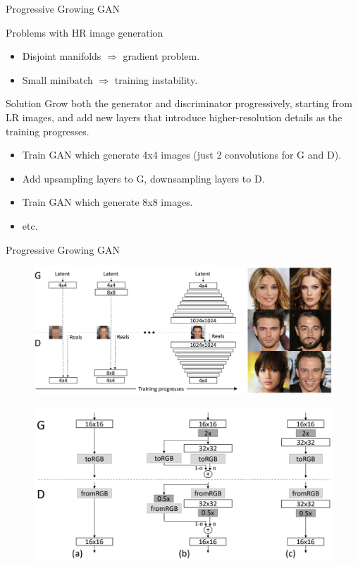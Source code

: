 \begin{frame}{Progressive Growing GAN}
	\begin{block}{Problems with HR image generation}
		\begin{itemize}
			\item Disjoint manifolds $\Rightarrow$ gradient problem.
			\item Small minibatch $\Rightarrow$ training instability.
		\end{itemize}
	\end{block}
	\begin{block}{Solution}
		Grow both the generator and discriminator progressively, starting from LR images, and add new layers that introduce higher-resolution details as the training progresses. 
		\begin{itemize}
			\item Train GAN which generate 4x4 images (just 2 convolutions for G and D).
			\item Add upsampling layers to G, downsampling layers to D.
			\item Train GAN which generate 8x8 images.
			\item etc.
		\end{itemize}
	\end{block}
	
\end{frame}
\begin{frame}{Progressive Growing GAN}
	\begin{figure}
		\centering
		\includegraphics[width=0.8\linewidth]{figs/pggan_arch}
	\end{figure}
	\begin{figure}
		\centering
		\includegraphics[width=0.6\linewidth]{figs/pggan_fadein}
	\end{figure}

\end{frame}
